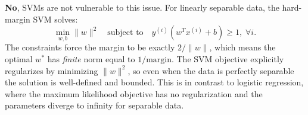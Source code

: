 \begin{answer}
\textbf{No}, SVMs are not vulnerable to this issue. For linearly separable data, the hard-margin SVM solves:
$$\min_{w,b} \|w\|^2 \quad \text{subject to} \quad y^{(i)}(w^T x^{(i)} + b) \geq 1, \;\forall i.$$
The constraints force the margin to be exactly $2/\|w\|$, which means the optimal $w^*$ has \emph{finite} norm equal to $1/\text{margin}$. The SVM objective explicitly regularizes by minimizing $\|w\|^2$, so even when the data is perfectly separable the solution is well-defined and bounded. This is in contrast to logistic regression, where the maximum likelihood objective has no regularization and the parameters diverge to infinity for separable data.
\end{answer}
